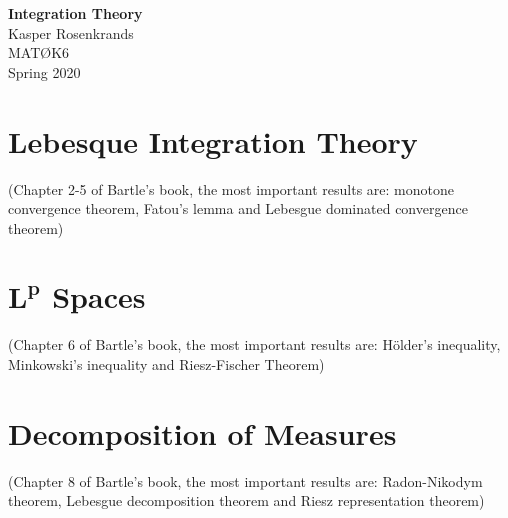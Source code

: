 \documentclass{article}
\begin{document}
\thispagestyle{empty}
\begin{center}
{\huge\textbf{Integration Theory}}\\[2mm]
{\Large Kasper Rosenkrands}\\[2cm]
{\large MATØK6}\\[2mm]
{\large Spring 2020}
\end{center}

\newpage


\section{Lebesque Integration Theory}
(Chapter 2-5 of Bartle's book, the most important results are: monotone convergence theorem, Fatou's lemma and Lebesgue dominated convergence theorem)

\newpage

\section{$\mathbf{L^p}$ Spaces}
(Chapter 6 of Bartle's book, the most important results are: Hölder's inequality, Minkowski's inequality and Riesz-Fischer Theorem)

\newpage

\section{Decomposition of Measures}
(Chapter 8 of Bartle's book, the most important results are: Radon-Nikodym theorem, Lebesgue decomposition theorem and Riesz representation theorem)
\end{document}
